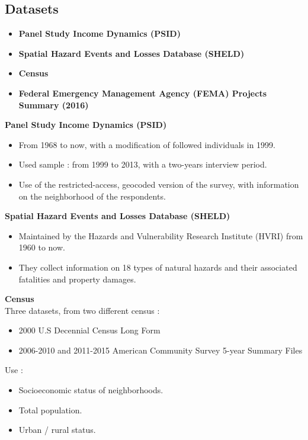 \documentclass{beamer}
\begin{document}
\subsection{Datasets}
\begin{frame}{\subsecname}
\begin{itemize}
    \item \textbf{Panel Study Income Dynamics (PSID)}
    \item \textbf{Spatial Hazard Events and Losses Database (SHELD)}
    \item \textbf{Census} 
    \item \textbf{Federal Emergency Management Agency (FEMA) Projects Summary (2016)}
\end{itemize}
\end{frame}

\begin{frame}{\subsecname}
    \textbf{Panel Study Income Dynamics (PSID)}
    \begin{itemize}
        \item From 1968 to now, with a modification of followed individuals in 1999.
        \item Used sample : from 1999 to 2013, with a two-years interview period. 
        \item Use of the restricted-access, geocoded version of the survey, with information on the neighborhood of the respondents.
    \end{itemize}
\end{frame}

\begin{frame}{\subsecname}
    \textbf{Spatial Hazard Events and Losses Database (SHELD)}
    \begin{itemize}
        \item Maintained by the Hazards and Vulnerability Research Institute (HVRI) from 1960 to now.
        \item They collect information on 18 types of natural hazards and their associated fatalities 
        and property damages. 
    \end{itemize}
\end{frame}

\begin{frame}{\subsecname}
    \textbf{Census}
    \\ Three datasets, from two different census : 
    \begin{itemize}
        \item 2000 U.S Decennial Census Long Form
        \item 2006-2010 and 2011-2015 American Community Survey 5-year Summary Files
    \end{itemize}
    Use : 
    \begin{itemize}
        \item Socioeconomic status of neighborhoods.
        \item Total population. 
        \item Urban / rural status. 
    \end{itemize}
\end{frame}
\end{document}
